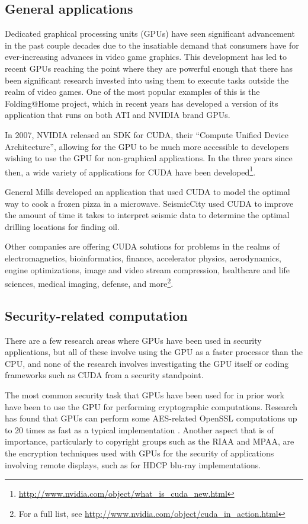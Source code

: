 \documentclass[letterpaper,10pt]{article}
\begin{document}
\begin{multicols}{2}
\subsection{General applications}
  
  Dedicated graphical processing units (GPUs) have seen significant advancement
in the past couple decades due to the insatiable demand that consumers have for
ever-increasing advances in video game graphics. This development has led to
recent GPUs reaching the point where they are powerful enough that there has
been significant research invested into using them to execute tasks outside the
realm of video games. One of the most popular examples of this is the
Folding@Home project, which in recent years has developed a version of its
application that runs on both ATI and NVIDIA brand GPUs\cite{foldingathome}.
  
  In 2007, NVIDIA released an SDK for CUDA, their ``Compute Unified Device
Architecture'', allowing for the GPU to be much more accessible to developers
wishing to use the GPU for non-graphical applications. In the three years since
then, a wide variety of applications for CUDA have been developed\footnote{\url{http://www.nvidia.com/object/what\_is\_cuda\_new.html}}.
  
  General Mills developed an application that used CUDA to model the optimal
way to cook a frozen pizza in a microwave. SeismicCity used CUDA to improve the
amount of time it takes to interpret seismic data to determine the optimal
drilling locations for finding oil\cite{cudainaction}.
  
  Other companies are offering CUDA solutions for problems in the realms of
electromagnetics, bioinformatics, finance, accelerator physics, aerodynamics,
engine optimizations, image and video stream compression, healthcare and life
sciences, medical imaging, defense, and more\footnote{For a full list, see \url{http://www.nvidia.com/object/cuda\_in\_action.html}}.
  
\subsection{Security-related computation}
  There are a few research areas where GPUs have been used in security applications, but all of these involve using the GPU as a faster processor than the CPU, and none of the research involves investigating the GPU itself or coding frameworks such as CUDA from a security standpoint.
  
  The most common security task that GPUs have been used for in prior work have been to use the GPU for performing cryptographic computations. Research has found that GPUs can perform some AES-related OpenSSL computations up to 20 times as fast as a typical implementation
\cite{cudaaes}. Another aspect that is of importance, particularly to copyright groups such as the RIAA and MPAA, are the encryption techniques used with GPUs for the security of applications involving remote displays, such as for HDCP blu-ray implementations\cite{cryptographics}.
  

\end{multicols}
\end{document}
